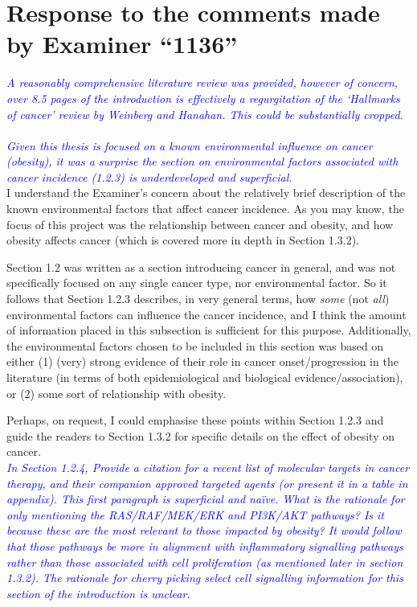 \documentclass[a4paper, 12pt]{article}
\begin{document}
\section*{Response to the comments made by Examiner ``1136''}
\label{sec:response_to_comments_from_examiner_1136}

\noindent
\textcolor{blue}{
	\textit{A reasonably comprehensive literature review was provided, however of concern, over 8.5 pages of the introduction is effectively a regurgitation of the `Hallmarks of cancer' review by Weinberg and Hanahan.
	This could be substantially cropped.
	}
}\\

\noindent
\\

\noindent
\textcolor{blue}{
	\textit{Given this thesis is focused on a known environmental influence on cancer (obesity), it was a surprise the section on environmental factors associated with cancer incidence (1.2.3) is underdeveloped and superficial.
	}
}\\

\noindent
I understand the Examiner's concern about the relatively brief description of the known environmental factors that affect cancer incidence.
As you may know, the focus of this project was the relationship between cancer and obesity, and how obesity affects cancer (which is covered more in depth in Section 1.3.2).

Section 1.2 was written as a section introducing cancer in general, and was not specifically focused on any single cancer type, nor environmental factor.
So it follows that Section 1.2.3 describes, in very general terms, how \textit{some} (not \textit{all}) environmental factors can influence the cancer incidence, and I think the amount of information placed in this subsection is sufficient for this purpose.
Additionally, the environmental factors chosen to be included in this section was based on either (1) (very) strong evidence of their role in cancer onset/progression in the literature (in terms of both epidemiological and biological evidence/association), or (2) some sort of relationship with obesity.

Perhaps, on request, I could emphasise these points within Section 1.2.3 and guide the readers to Section 1.3.2 for specific details on the effect of obesity on cancer.
\\

\noindent
\textcolor{blue}{
	\textit{In Section 1.2.4, Provide a citation for a recent list of molecular targets in cancer therapy, and their companion approved targeted agents (or present it in a table in appendix).
	This first paragraph is superficial and na\"ive.
	What is the rationale for only mentioning the RAS/RAF/MEK/ERK and PI3K/AKT pathways?
	Is it because these are the most relevant to those impacted by obesity?
	It would follow that those pathways be more in alignment with inflammatory signalling pathways rather than those associated with cell proliferation (as mentioned later in section 1.3.2).
	The rationale for cherry picking select cell signalling information for this section of the introduction is unclear.
	}
}\\
\end{document}
